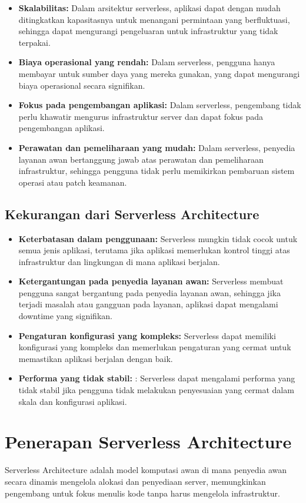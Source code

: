 \begin{itemize}
	\item \textbf{Skalabilitas:} Dalam arsitektur serverless, aplikasi dapat dengan mudah ditingkatkan kapasitasnya untuk menangani permintaan yang berfluktuasi, sehingga dapat mengurangi pengeluaran untuk infrastruktur yang tidak terpakai.
	\item \textbf{Biaya operasional yang rendah:} Dalam serverless, pengguna hanya membayar untuk sumber daya yang mereka gunakan, yang dapat mengurangi biaya operasional secara signifikan.
	\item \textbf{Fokus pada pengembangan aplikasi:} Dalam serverless, pengembang tidak perlu khawatir mengurus infrastruktur server dan dapat fokus pada pengembangan aplikasi.
	\item \textbf{Perawatan dan pemeliharaan yang mudah:} Dalam serverless, penyedia layanan awan bertanggung jawab atas perawatan dan pemeliharaan infrastruktur, sehingga pengguna tidak perlu memikirkan pembaruan sistem operasi atau patch keamanan.
\end{itemize}

\subsection{Kekurangan dari Serverless Architecture}

\begin{itemize}
	\item \textbf{Keterbatasan dalam penggunaan:} Serverless mungkin tidak cocok untuk semua jenis aplikasi, terutama jika aplikasi memerlukan kontrol tinggi atas infrastruktur dan lingkungan di mana aplikasi berjalan.
	\item \textbf{Ketergantungan pada penyedia layanan awan:} Serverless membuat pengguna sangat bergantung pada penyedia layanan awan, sehingga jika terjadi masalah atau gangguan pada layanan, aplikasi dapat mengalami downtime yang signifikan.
	\item \textbf{Pengaturan konfigurasi yang kompleks:} Serverless dapat memiliki konfigurasi yang kompleks dan memerlukan pengaturan yang cermat untuk memastikan aplikasi berjalan dengan baik.
	\item \textbf{Performa yang tidak stabil:} : Serverless dapat mengalami performa yang tidak stabil jika pengguna tidak melakukan penyesuaian yang cermat dalam skala dan konfigurasi aplikasi.
\end{itemize}

\section{Penerapan Serverless Architecture}
	Serverless Architecture adalah model komputasi awan di mana penyedia awan secara dinamis mengelola alokasi dan penyediaan server, memungkinkan pengembang untuk fokus menulis kode tanpa harus mengelola infrastruktur.
	
